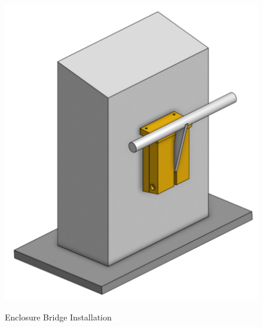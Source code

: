 \begin{figure}[H]
	\centering
	\caption{Enclosure Bridge Installation}	
	\includegraphics[scale=0.45]{Sections/Design-Process/enclosure-wall.png}
	\label{enclosure-wall}
\end{figure}


